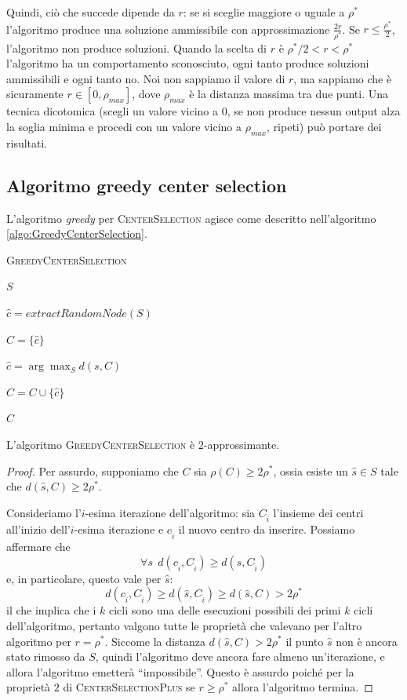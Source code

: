 Quindi, ciò che succede dipende da $r$: se si sceglie maggiore o uguale a $\rho^*$
l'algoritmo produce una soluzione ammissibile con approssimazione $\frac{2r}{\rho^*}$.
Se $r \leq \frac{\rho^*}{2}$, l'algoritmo non produce soluzioni. Quando la scelta di
$r$ è $ \rho^*/2 < r < \rho^*$ l'algoritmo ha un comportamento sconosciuto,
ogni tanto produce soluzioni ammissibili e ogni tanto no. Noi non sappiamo il valore
di $r$, ma sappiamo che è sicuramente $r \in [0, \rho_{max}]$, dove $\rho_{max}$
è la distanza massima tra due punti. Una tecnica dicotomica (scegli un valore vicino a $0$,
se non produce nessun output alza la soglia minima e procedi con un valore vicino a $\rho_{max}$,
ripeti) può portare dei risultati.

\subsection{Algoritmo greedy center selection}
L'algoritmo \textit{greedy} per \textsc{CenterSelection} agisce come descritto
nell'algoritmo \ref{algo:GreedyCenterSelection}.
\begin{algorithm}[h]
	\caption{\textsc{GreedyCenterSelection}}
	\label{algo:GreedyCenterSelection}

	{
		\Return $S$
	}

	$\hat{c} = extractRandomNode(S)$

	$C = \{\hat{c}\}$

	{
		$\hat{c} = \arg \max_{S} d(s, C)$

		$C = C \cup \{\hat{c}\}$
	}
	\Return $C$
\end{algorithm}

\begin{theorem}
	L'algoritmo \textsc{GreedyCenterSelection} è $2$-approssimante.
\end{theorem}
\begin{proof}
	Per assurdo, supponiamo che $C$ sia $\rho(C) \geq 2\rho^*$, ossia
	esiste un $\hat{s} \in S$ tale che $d(\hat{s}, C) \geq 2\rho^*$.

	Consideriamo l'$i$-esima iterazione dell'algoritmo: sia $C_{\hat{i}}$ l'insieme
	dei centri all'inizio dell'$i$-esima iterazione e $c_{\hat{i}}$ il nuovo centro
	da inserire. Possiamo affermare che
	$$
		\forall s ~~ d(c_{\hat{i}}, C_{\hat{i}}) \geq d(s, C_{\hat{i}})
	$$
	e, in particolare, questo vale per $\hat{s}$:
	$$
		d(c_{\hat{i}}, C_{\hat{i}}) \geq d(\hat{s}, C_{\hat{i}}) \geq d(\hat{s}, C) > 2\rho^*
	$$
	il che implica che i $k$ cicli sono una delle esecuzioni possibili dei primi
	$k$ cicli dell'algoritmo, pertanto valgono tutte le proprietà che valevano
	per l'altro algoritmo per $r = \rho^*$. Siccome la distanza $d(\hat{s}, C) > 2\rho^*$
	il punto $\hat{s}$ non è ancora stato rimosso da $S$, quindi l'algoritmo deve
	ancora fare almeno un'iterazione, e allora l'algoritmo emetterà ``impossibile''.
	Questo è assurdo poiché per la proprietà $2$ di \textsc{CenterSelectionPlus}
	se $r \geq \rho^*$  allora l'algoritmo termina.

\end{proof}


